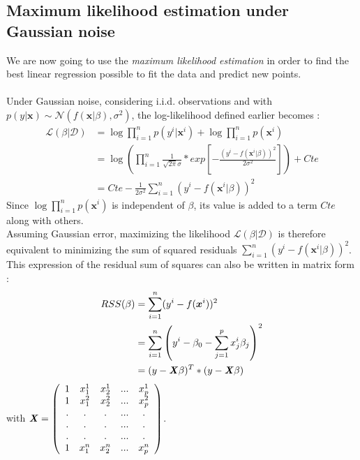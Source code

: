 \documentclass[a4paper,12pt]{article}
\newcommand{\dd}{\mathcal{D}}
\newcommand{\xx}{{\bm x}}
\begin{document}
\subsection{Maximum likelihood estimation under Gaussian noise}

We are now going to use the \textit{maximum likelihood estimation} in order to find the best linear regression possible to fit the data and predict new points. \\
\\
Under Gaussian noise, considering i.i.d. observations and with \(p(y|\xx)\sim{}\mathcal{N}(f(\xx|\beta),{\sigma}^2)\), the log-likelihood defined earlier becomes : 
\begin{align*}
\mathcal{L}(\beta|\dd) &= \log\displaystyle\prod_{i=1}^{n} p(y^i|\xx^i) + \log\displaystyle\prod_{i=1}^{n} p(\xx^i) \\  &= \log \left(\displaystyle\prod_{i=1}^{n} \frac{1}{\sqrt{2\pi}\sigma}*exp\left[ - \frac{(y^i - f(\xx^i|\beta))^2}{2\sigma^2} \right] \right ) + Cte  \\
& = Cte - \frac{1}{2\sigma^2} \displaystyle\sum_{i=1}^{n} (y^i - f(\xx^i|\beta))^2
\end{align*}
Since \(\log\displaystyle\prod_{i=1}^{n} p(\xx^i)\) is independent of \(\beta\), its value is added to a term \(Cte\) along with others. \\
Assuming Gaussian error, maximizing the likelihood \(\mathcal{L}(\beta|\dd)\) is therefore equivalent to minimizing the sum of squared residuals \(\displaystyle\sum_{i=1}^{n} (y^i - f(\xx^i|\beta))^2\). 
This expression of the residual sum of squares can also be written in matrix form : 
\begin{align*}
RSS(\beta) &= \displaystyle\sum_{i=1}^{n} (y^i - f(\xx^i))^2 \\  &= \displaystyle\sum_{i=1}^{n} \left( y^i - \beta_0 - \displaystyle\sum_{j=1}^{p} x_j^i \beta_j \right)^2 \\
& = (y - \textbf{\textit{X}} \beta)^T * (y - \textbf{\textit{X}} \beta)
\end{align*}
with \(\textbf{\textit{X}} = \left( \begin{array}{ccccc}
1 & x_1^1 & x_2^1 & ... & x_p^1 \\
1 & x_1^2 & x_2^2 & ... & x_p^2 \\
. & . & . & ... & .\\
. & . & . & ... & .\\
. & . & . & ... & .\\
1 & x_1^n & x_2^n & ... & x_p^n \end{array} \right) \). 
\end{document}
